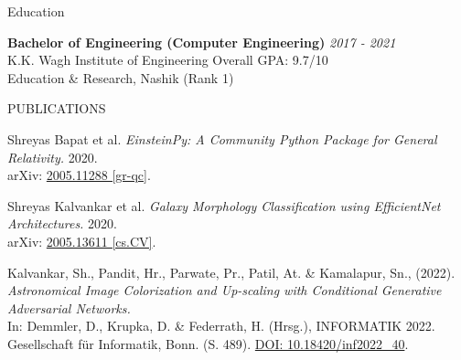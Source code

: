 \documentclass{resume} %
\begin{document}
\smallskip
\begin{rSection}{Education}

{\bf Bachelor of Engineering (Computer Engineering)} \hfill {\em 2017 - 2021}
\\ K.K. Wagh Institute of Engineering  \hfill { Overall GPA: 9.7/10}
\\ Education \& Research, Nashik    \hfill {\small{(Rank 1)}}

\smallskip


\end{rSection}
\begin{rSection}{PUBLICATIONS}
\vspace{-1em}
\item Shreyas Bapat et al. \textit{EinsteinPy: A Community Python Package for General Relativity.} 2020.\\ arXiv: \href{https://arxiv.org/abs/2005.11288}{2005.11288 [gr-qc]}.

\item Shreyas Kalvankar et al. \textit{Galaxy Morphology Classification using EfficientNet Architectures.} 2020.\\ arXiv:
\href{https://arxiv.org/abs/2008.13611}{2005.13611 [cs.CV]}.

\item Kalvankar, Sh., Pandit, Hr., Parwate, Pr., Patil, At. \& Kamalapur, Sn., (2022). \textit{Astronomical Image Colorization and Up-scaling with Conditional Generative Adversarial Networks.}\\ In: Demmler, D., Krupka, D. \& Federrath, H. (Hrsg.), INFORMATIK 2022. Gesellschaft für Informatik, Bonn. (S. 489).
\href{https://dl.gi.de/bitstream/handle/20.500.12116/39540/mlastro\_04.pdf}{DOI: 10.18420/inf2022\_40}.
\end{rSection}
\end{document}
